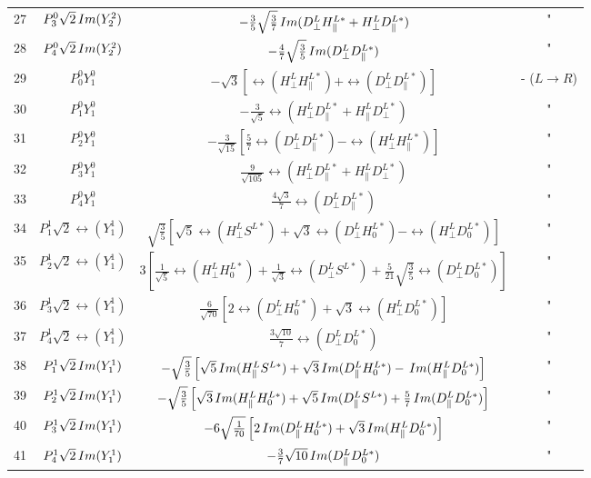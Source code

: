\begin{tabular}{lccc}
 27  &   $P^0_3 \sqrt{2}\, Im(Y^2_2)$ &  $-\frac{3}{5} \sqrt{ \frac{3}{7}}  \, Im(D^L_\perp H^{L\ast}_\parallel + H^L_\perp D^{L\ast}_\parallel)  $  & " \\
 28  &   $P^0_4 \sqrt{2}\, Im(Y^2_2)$ &  $-\frac{4}{7} \sqrt{\frac{3}{5}}  \, Im(D^L_\perp D^{L\ast}_\parallel) $   & " \\ 
 29  &   $P^0_0 Y^0_1$     &  $-\sqrt{3}\left[ \rel(H^L_\perp H^{L\ast}_\parallel) + \rel(D^L_\perp D^{L\ast}_\parallel) \right]$  & - ($L \to R$) \\
 30  &   $P^0_1 Y^0_1$     &  $-\frac{3}{\sqrt{5}} \rel( H^L_\perp D^{L\ast}_\parallel + H^L_\parallel D^{L\ast}_\perp ) $ & " \\
 31  &   $P^0_2 Y^0_1$     &  $-\frac{3}{\sqrt{15}} \left[ \frac{5}{7} \rel(D^L_\perp D^{L\ast}_\parallel) - \rel(H^L_\perp H^{L\ast}_\parallel)  \right]$ & " \\
 32  &   $P^0_3 Y^0_1$     &  $\frac{9}{\sqrt{105}}  \rel(H^L_\perp D^{L\ast}_\parallel  + H^L_\parallel D^{L\ast}_\perp ) $ & " \\
 33  &   $P^0_4 Y^0_1$     &  $\frac{4\sqrt{3}}{7} \rel(D^L_\perp D^{L\ast}_\parallel)$  & " \\
 34  &   $P^1_1 \sqrt{2}\rel(Y^1_1)$   & $\sqrt{\frac{3}{5}} \left[ \sqrt{5} \rel(H^L_\perp S^{L \ast})  + \sqrt{3} \rel(D^L_\perp H^{L\ast}_0)  - \rel(H^L_\perp D^{L \ast}_0) \right]$  & " \\
 35  &   $P^1_2 \sqrt{2}\rel(Y^1_1)$   & $ 3 \left[ \frac{1}{\sqrt{5}} \rel(H^L_\perp H^{L \ast}_0)  + \frac{1}{\sqrt{3}} \rel(D^L_\perp S^{L\ast})  + \frac{5}{21} \sqrt{\frac{3}{5}} \rel(D^L_\perp D^{L \ast}_0 ) \right] $  & " \\
 36  &   $P^1_3 \sqrt{2}\rel(Y^1_1)$   & $ \frac{6}{\sqrt{70}} \left[ 2 \rel(D^L_\perp H^{L \ast}_0)  + \sqrt{3} \rel(H^L_\perp D^{L\ast}_0) \right]$  & " \\
 37  &   $P^1_4 \sqrt{2}\rel(Y^1_1)$   & $\frac{3 \sqrt{10}}{7} \rel(D^L_\perp D^{L \ast}_0 ) $  & " \\
 38  &   $P^1_1 \sqrt{2}\, Im(Y^1_1)$   & $-\sqrt{\frac{3}{5}} \left[ \sqrt{5} \, Im ( H^L_\parallel S^{L\ast}) + \sqrt{3} \, Im(D^L_\parallel H^{L \ast}_0) - \, Im(H^L_\parallel D^{L \ast}_0)  \right]  $  & " \\
 39  &   $P^1_2 \sqrt{2}\, Im(Y^1_1)$   & $ -\sqrt{\frac{3}{5}} \left[ \sqrt{3} \, Im(H^L_\parallel H^{L \ast}_0)  + \sqrt{5} \, Im(D^L_\parallel S^{L\ast})  + \frac{5}{7} \, Im(D^L_\parallel D^{L \ast}_0 )\right] $  & " \\
 40  &   $P^1_3 \sqrt{2}\, Im(Y^1_1)$   & $ -6\sqrt{\frac{1}{70}}\left[ 2\, Im(D^L_\parallel H^{L \ast}_0)  + \sqrt{3} \, Im(H^L_\parallel D^{L\ast}_0)\right]$   & " \\
 41  &   $P^1_4 \sqrt{2}\, Im(Y^1_1)$   & $-\frac{3}{7} \sqrt{10} \, Im(D^L_\parallel D^{L\ast}_0) $  & " \\
\end{tabular}
